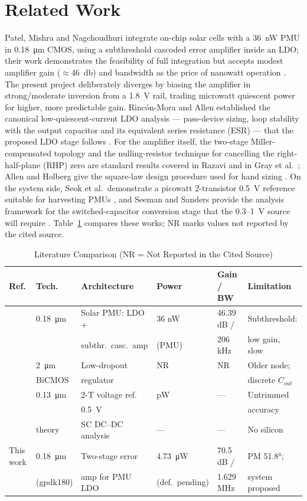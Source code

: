 \documentclass[conference]{IEEEtran}
\begin{document}
\section{Related Work}
Patel, Mishra and Nagchoudhuri integrate on-chip solar cells with a
\SI{36}{\nano\watt} PMU in 0.18~\si{\micro\metre} CMOS, using a subthreshold
cascoded error amplifier inside an LDO; their work demonstrates the
feasibility of full integration but accepts modest amplifier gain
($\approx$\SI{46}{\decibel}) and bandwidth as the price of nanowatt operation
\cite{patel2017}. The present project deliberately diverges by biasing the
amplifier in strong/moderate inversion from a \SI{1.8}{\volt} rail, trading
microwatt quiescent power for higher, more predictable gain.
Rinc\'on-Mora and Allen established the canonical low-quiescent-current LDO
analysis --- pass-device sizing, loop stability with the output capacitor and
its equivalent series resistance (ESR) --- that the proposed LDO stage
follows \cite{rincon1998}. For the amplifier itself, the two-stage
Miller-compensated topology and the nulling-resistor technique for cancelling
the right-half-plane (RHP) zero are standard results covered in Razavi and in
Gray et al.\ \cite{razavi,gray}; Allen and Holberg give the square-law design
procedure used for hand sizing \cite{allen}. On the system side, Seok et al.\
demonstrate a picowatt 2-transistor \SI{0.5}{\volt} reference suitable for
harvesting PMUs \cite{seok2012}, and Seeman and Sanders provide the analysis
framework for the switched-capacitor conversion stage that the
0.3--1~\si{\volt} source will require \cite{seeman2008}.
Table~\ref{tab:lit} compares these works; NR marks values not reported by the
cited source.

\begin{table}[!t]
\caption{Literature Comparison (NR = Not Reported in the Cited Source)}
\label{tab:lit}
\centering\scriptsize
\begin{tabular}{@{}llllll@{}}
\toprule
Ref. & Tech. & Architecture & Power & Gain / BW & Limitation \\
\midrule
\cite{patel2017} & 0.18~\si{\micro\metre} & Solar PMU: LDO + & 36 nW & 46.39 dB / & Subthreshold: \\
 & & subthr.\ casc.\ amp & (PMU) & 206 kHz & low gain, slow \\
\cite{rincon1998} & 2~\si{\micro\metre} & Low-dropout & NR & NR & Older node; \\
 & BiCMOS & regulator & & & discrete $C_{out}$ \\
\cite{seok2012} & 0.13~\si{\micro\metre} & 2-T voltage ref. & pW & --- & Untrimmed \\
 & & \SI{0.5}{\volt} & & & accuracy \\
\cite{seeman2008} & theory & SC DC--DC analysis & --- & --- & No silicon \\
This work & 0.18~\si{\micro\metre} & Two-stage error & 4.73~\si{\micro\watt} & 70.5 dB / & PM \ang{51.8}; \\
 & (gpdk180) & amp for PMU LDO & (def.\ pending) & 1.629 MHz & system proposed \\
\bottomrule
\end{tabular}
\end{table}
\end{document}
